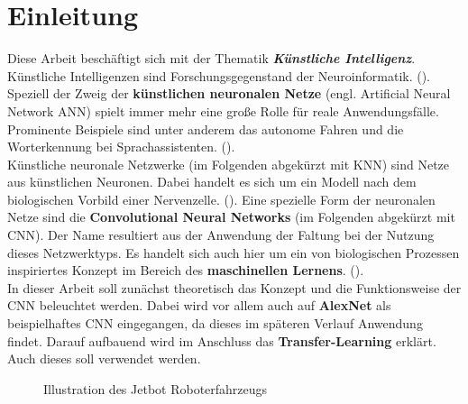 \section{Einleitung} \label{sec:einleitung}
Diese Arbeit beschäftigt sich mit der Thematik \textit{\textbf{\glqq Künstliche Intelligenz\grqq{}}}. Künstliche Intelligenzen sind Forschungsgegenstand der Neuroinformatik. (\vgl \cite[3]{Schaeffer2021}). Speziell der Zweig der \textbf{künstlichen neuronalen Netze} (engl.\xspace Artificial Neural Network ANN) spielt immer mehr eine große Rolle für reale Anwendungsfälle. Prominente Beispiele sind unter anderem das autonome Fahren und die Worterkennung bei Sprachassistenten. (\vgl \cite[15]{Styczynski2017}). \\
Künstliche neuronale Netzwerke (im Folgenden abgekürzt mit KNN) sind Netze aus künstlichen Neuronen. Dabei handelt es sich um ein Modell nach dem biologischen Vorbild einer Nervenzelle. (\vgl \cite[136,137]{Styczynski2017}). Eine spezielle Form der neuronalen Netze sind die \textbf{Convolutional Neural Networks} (im Folgenden abgekürzt mit CNN). Der Name resultiert aus der Anwendung der Faltung  bei der Nutzung dieses Netzwerktyps. Es handelt sich auch hier um ein von biologischen Prozessen inspiriertes Konzept im Bereich des \textbf{maschinellen Lernens}. (\vgl \cite[50]{Prakash2021}). \\
In dieser Arbeit soll zunächst theoretisch das Konzept und die Funktionsweise der CNN beleuchtet werden. Dabei wird vor allem auch auf \textbf{AlexNet} als beispielhaftes CNN eingegangen, da dieses im späteren Verlauf Anwendung findet. Darauf aufbauend wird im Anschluss das \textbf{Transfer-Learning} erklärt. Auch dieses soll verwendet werden.

\begin{figure}
    \centering
   \caption[Illustration Jetbot Roboterfahrzeug]{Illustration des Jetbot Roboterfahrzeugs}
   \label{fig:Bild1.1}
\end{figure}

